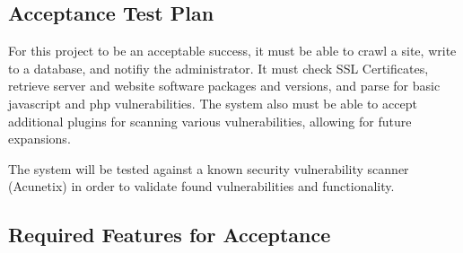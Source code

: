 \documentclass{article}
\begin{document}
\subsection{Acceptance Test Plan}
For this project to be an acceptable success, it must be able to crawl a site, write to a database, and notifiy the administrator.  It must check SSL Certificates, retrieve server and website software packages and versions, and parse for basic javascript and php vulnerabilities.  The system also must be able to accept additional plugins for scanning various vulnerabilities, allowing for future expansions.

The system will be tested against a known security vulnerability scanner (Acunetix) in order to validate found vulnerabilities and  functionality.
\subsection{Required Features for Acceptance}
\end{document}
